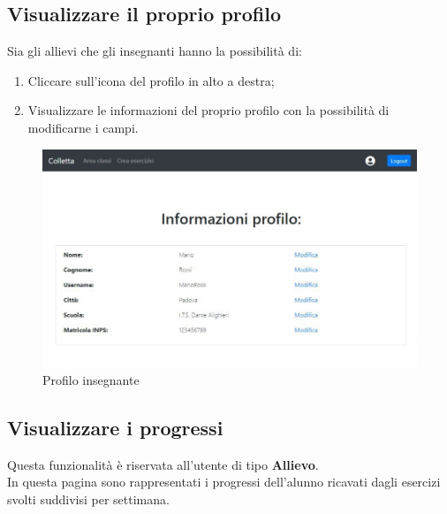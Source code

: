 \documentclass[11pt,a4paper]{article}
\begin{document}
{	\subsection{Visualizzare il proprio profilo}
	Sia gli allievi che gli insegnanti hanno la possibilità di:
	\begin{enumerate}
		\item Cliccare sull'icona del profilo in alto a destra;
		\item Visualizzare le informazioni del proprio profilo con la possibilità di modificarne i campi.
	\end{enumerate}
\newpage
	\begin{figure}[h]
		\centering
		\includegraphics[scale=0.65]{images/profiloinsegnante.jpg}
		\caption{Profilo insegnante}
	\end{figure}
	
	
	\subsection{Visualizzare i progressi}
	Questa funzionalità è riservata all'utente di tipo \textbf{Allievo}.\\
	In questa pagina sono rappresentati i progressi dell'alunno ricavati dagli esercizi svolti suddivisi per settimana.
	
}
\end{document}

